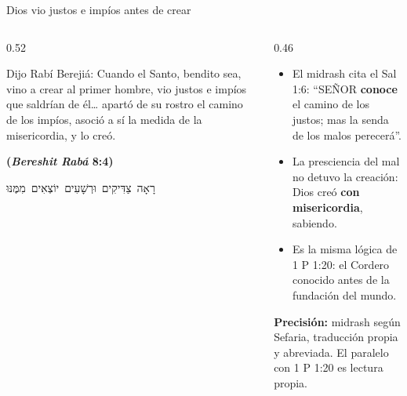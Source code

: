 \documentclass[hyperref={bookmarks=false},aspectratio=169]{beamer}
\newcommand{\heb}[1]{\mbox{\foreignlanguage{hebrew}{#1}}}
\newcommand{\SENOR}{S{\fontsize{0.78em}{1em}\selectfont EÑOR}}
\newcommand{\fuente}[1]{\par\hfill{\upshape\bfseries\footnotesize\textcolor{azul}{#1}}}
\newcommand{\destacar}[1]{\textbf{\textcolor{azul}{#1}}}
\newcommand{\precision}[1]{{\footnotesize\color{gris}\textbf{Precisión:} #1}}
\begin{document}
\begin{frame}{Dios vio justos e impíos antes de crear}
\begin{columns}[t,onlytextwidth]
\begin{column}{0.52\textwidth}
\begin{cita}Dijo Rabí Berejiá: Cuando el Santo, bendito sea, vino a crear al primer hombre, vio justos e impíos que saldrían de él\ldots{} apartó de su rostro el camino de los impíos, asoció a sí la medida de la misericordia, y lo creó.\fuente{(\emph{Bereshit Rabá} 8:4)}\end{cita}
\begin{center}\heb{רָאָה צַדִּיקִים וּרְשָׁעִים יוֹצְאִים מִמֶּנּוּ}\end{center}
\end{column}
\begin{column}{0.46\textwidth}\small
\begin{itemize}
\item El midrash cita el Sal 1:6: ``\SENOR{} \destacar{conoce} el camino de los justos; mas la senda de los malos perecerá''.
\item La presciencia del mal no detuvo la creación: Dios creó \destacar{con misericordia}, sabiendo.
\item Es la misma lógica de 1 P 1:20: el Cordero conocido antes de la fundación del mundo.
\end{itemize}
\precision{midrash según Sefaria, traducción propia y abreviada. El paralelo con 1 P 1:20 es lectura propia.}
\end{column}
\end{columns}
\end{frame}
\end{document}

